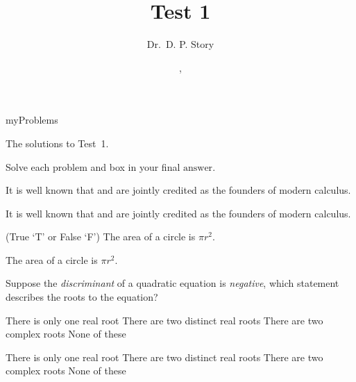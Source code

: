 \documentclass{article}
\title[T1]{Test 1}
\author{Dr.\ D. P. Story}
\date{\thisterm, \the\year}
\begin{document}
\maketitle

\begin{exam}{myProblems}

\ifsolutionsonly
\begin{instructions}[Solutions.]
The solutions to Test~1.
\end{instructions}
\belowsqskip{\par} %
\else
\begin{instructions}
Solve each problem and box in your final $\boxed{\text{answer}}$.
\end{instructions}
\fi

\begin{theseproblems}

\begin{problem*}[3ea]
\leadinitem
    It is well known that  and
     are jointly credited as the founders
    of modern calculus.
\ifkeyalt
\begin{solution}
    It is well known that  and
     are jointly credited as the founders
    of modern calculus.
\end{solution}
\fi

\begin{parts}
\item {} (True `T' or False `F') The area of a circle is $\pi r^2$.
\ifkeyalt
\begin{solution}
\item{} The area of a circle is $\pi r^2$.
\end{solution}
\fi

\item Suppose the \emph{discriminant} of a quadratic equation is
\emph{negative}, which statement describes the roots to
the equation?
\begin{answers}{2}
\bChoices
     There is only one real root\eAns
     There are two distinct real roots\eAns
     There are two complex roots\eAns
     None of these\eAns
\eChoices
\end{answers}
\ifkeyalt
\begin{solution}[]
\parbox[t]{\linewidth}{%
\begin{answers}{2}
\bChoices
     There is only one real root\eAns
     There are two distinct real roots\eAns
     There are two complex roots\eAns
     None of these\eAns
\eChoices
\end{answers}}%
\adjDisplayBelow
\end{solution}
\fi
\end{parts}
\end{problem*}


\end{theseproblems}
\end{exam}
\end{document}
